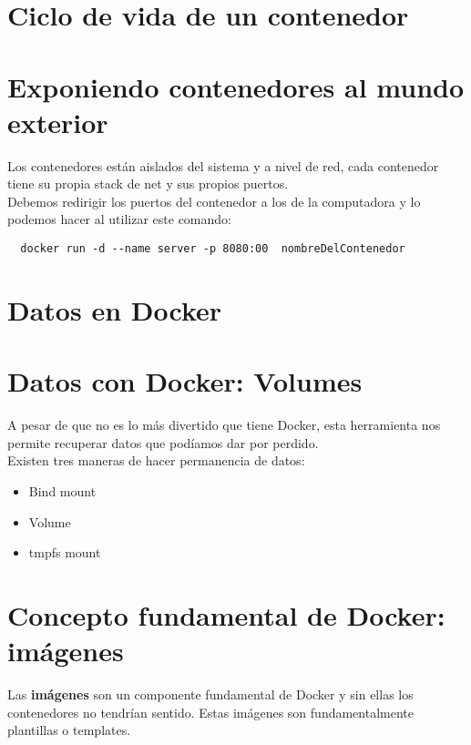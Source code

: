 \documentclass{article}
\begin{document}
\section{Ciclo de vida de un contenedor}%


\section{Exponiendo contenedores al mundo exterior}%
Los contenedores están aislados del sistema y a nivel de red, cada contenedor
tiene su propia stack de net y sus propios puertos.\\

Debemos redirigir los puertos del contenedor a los de la computadora y lo
podemos hacer al utilizar este comando:

\begin{verbatim}
  docker run -d --name server -p 8080:00  nombreDelContenedor
\end{verbatim}


\section{Datos en Docker}%

\section{Datos con Docker: Volumes}%
A pesar de que no es lo más divertido que tiene Docker, esta herramienta nos
permite recuperar datos que podíamos dar por perdido.\\

Existen tres maneras de hacer permanencia de datos:

\begin{itemize}
  \item Bind mount
  \item Volume
  \item tmpfs mount
\end{itemize}

\section{Concepto fundamental de Docker: imágenes}%
Las \textbf{imágenes} son un componente fundamental de Docker y sin ellas los
contenedores no tendrían sentido. Estas imágenes son fundamentalmente
plantillas o templates.\\
\end{document}
